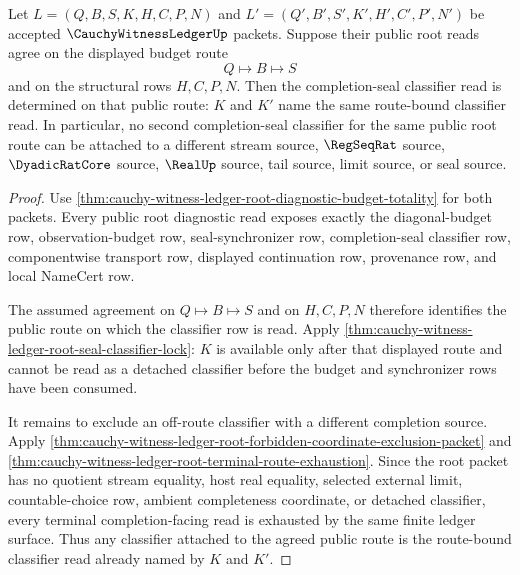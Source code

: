 \begin{theorem}
\label{thm:cauchy-witness-ledger-root-budget-classifier-determinacy}
Let $L=(Q,B,S,K,H,C,P,N)$ and $L'=(Q',B',S',K',H',C',P',N')$ be accepted $\CauchyWitnessLedgerUp$ packets. Suppose their public root reads agree on the displayed budget route
$$
Q \longmapsto B \longmapsto S
$$
and on the structural rows $H,C,P,N$. Then the completion-seal classifier read is determined on that public route: $K$ and $K'$ name the same route-bound classifier read. In particular, no second completion-seal classifier for the same public root route can be attached to a different stream source, $\RegSeqRat$ source, $\DyadicRatCore$ source, $\RealUp$ source, tail source, limit source, or seal source.
\end{theorem}
\begin{proof}
Use \autoref{thm:cauchy-witness-ledger-root-diagnostic-budget-totality} for both packets. Every public root diagnostic read exposes exactly the diagonal-budget row, observation-budget row, seal-synchronizer row, completion-seal classifier row, componentwise transport row, displayed continuation row, provenance row, and local NameCert row.

The assumed agreement on $Q \longmapsto B \longmapsto S$ and on $H,C,P,N$ therefore identifies the public route on which the classifier row is read. Apply \autoref{thm:cauchy-witness-ledger-root-seal-classifier-lock}: $K$ is available only after that displayed route and cannot be read as a detached classifier before the budget and synchronizer rows have been consumed.

It remains to exclude an off-route classifier with a different completion source. Apply \autoref{thm:cauchy-witness-ledger-root-forbidden-coordinate-exclusion-packet} and \autoref{thm:cauchy-witness-ledger-root-terminal-route-exhaustion}. Since the root packet has no quotient stream equality, host real equality, selected external limit, countable-choice row, ambient completeness coordinate, or detached classifier, every terminal completion-facing read is exhausted by the same finite ledger surface. Thus any classifier attached to the agreed public route is the route-bound classifier read already named by $K$ and $K'$.
\end{proof}

